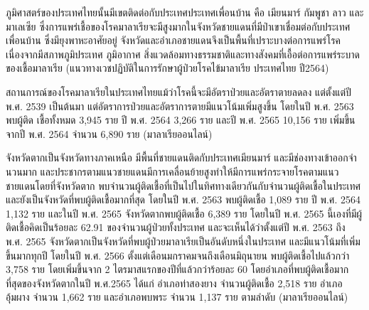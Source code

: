 \begin{titlepage}
\begin{enumerate}
          ภูมิศาสตร์ของประเทศไทยนั้นมีเขตติดต่อกับประเทศประเทศเพื่อนบ้าน คือ เมียนมาร์ กัมพูชา ลาว และมาเลเซีย ซึ่งการแพร่เชื้อของโรคมาลาเรียจะมีสูงมากในจังหวัดชายแดนที่มีป่าเขาเชื่อมต่อกับประเทศเพื่อนบ้าน ซึ่งมียุงพาหะอาศัยอยู่ จังหวัดและอำเภอชายแดนจึงเป็นพื้นที่เปราะบางต่อการแพร่โรคเนื่องจากมีสภาพภูมิประเทศ ภูมิอากาศ สิ่งแวดล้อมทางธรรมชาติและทางสังคมที่เอื้อต่อการแพร่ระบาดของเชื้อมาลาเรีย  (แนวทางเวชปฏิบัติในการรักษาผู้ป่วยโรคไข้มาลาเรีย ประเทศไทย ปี2564)

          สถานการณ์ของโรคมาลาเรียในประเทศไทยแม้ว่าโรคนี้จะมีอัตราป่วยและอัตราตายลดลง แต่ตั้งแต่ปี  พ.ศ. 2539 เป็นต้นมา แต่อัตราการป่วยและอัตราการตายมีแนวโน้มเพิ่มสูงขึ้น โดยในปี พ.ศ. 2563 พบผู้ติด เชื้อทั้งหมด 3,945 ราย ปี พ.ศ. 2564 3,266 ราย และปี พ.ศ. 2565 10,156 ราย  เพิ่มขึ้นจากปี พ.ศ. 2564 จำนวน 6,890 ราย (มาลาเรียออนไลน์)

          จังหวัดตากเป็นจังหวัดทางภาคเหนือ มีพื้นที่ชายแดนติดกับประเทศเมียนมาร์  และมีช่องทางเข้าออกจํานวนมาก และประชากรตามแนวชายแดนมีการเคลื่อนย้ายสูงทําให้มีการแพร่กระจายโรคตามแนวชายแดนโดยที่จังหวัดตาก พบจำนวนผู้ติดเชื้อที่เป็นไปในทิศทางเดียวกันกับจำนวนผู้ติดเชื้อในประเทศ และยังเป็นจังหวัดที่พบผู้ติดเชื้อมากที่สุด โดยในปี พ.ศ. 2563 พบผู้ติดเชื้อ 1,089 ราย ปี พ.ศ. 2564 1,132 ราย และในปี พ.ศ. 2565 จังหวัดตากพบผู้ติดเชื้อ 6,389 ราย  โดยในปี พ.ศ. 2565 นี้เองที่มีผู้ติดเชื้อคิดเป็นร้อยละ 62.91 ของจำนวนผู้ป่วยทั้งประเทศ และจะเห็นได้ว่าตั้งแต่ปี พ.ศ. 2563 ถึง พ.ศ. 2565 จังหวัดตากเป็นจังหวัดที่พบผู้ป่วยมาลาเรียเป็นอันดับหนึ่งในประเทศ และมีแนวโน้มที่เพิ่มขึ้นมากทุกปี โดยในปี พ.ศ. 2566 ตั้งแต่เดือนมกราคมจนถึงเดือนมิถุนายน พบผู้ติดเชื้อไปแล้วกว่า 3,758 ราย โดยเพิ่มขึ้นจาก 2 ไตรมาสแรกของปีที่แล้วกว่าร้อยละ 60 โดยอำเภอที่พบผู้ติดเชื้อมากที่สุดของจังหวัดตากในปี พ.ศ.2565 ได้แก่ อำเภอท่าสองยาง จำนวนผู้ติดเชื้อ 2,518 ราย อำเภออุ้มผาง จำนวน 1,662 ราย และอำเภอพบพระ จำนวน 1,137 ราย ตามลำดับ (มาลาเรียออนไลน์)


\end{enumerate}
\end{titlepage}
